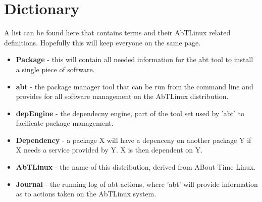 \newpage
\section{Dictionary}
A list can be found here that contains terms and their AbTLinux related
definitions. Hopefully this will keep everyone on the same page.

\begin{itemize}
  \item \textbf{Package} - this will contain all needed information for the abt tool to install a single piece of software.
  \item \textbf{abt} - the package manager tool that can be run from the command line and provides for all software management on the AbTLinux distribution.
  \item \textbf{depEngine} - the dependecny engine, part of the tool set used by 'abt' to facilicate package management.
  \item \textbf{Dependency} - a package X will have a depenceny on another package Y if X needs a service provided by Y. X is then dependent on Y.
  \item \textbf{AbTLinux} - the name of this distribution, derived from ABout Time Linux.
  \item \textbf{Journal} - the running log of abt actions, where 'abt' will provide information as to actions taken on the AbTLinux system.
\end{itemize}
